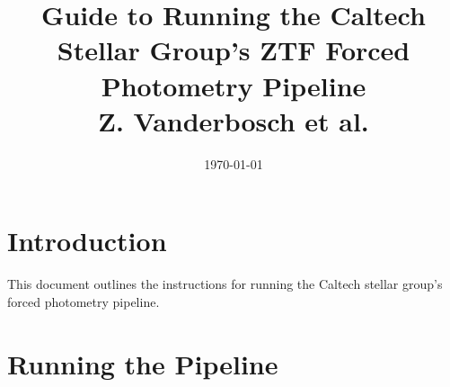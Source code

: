 \documentclass[12pt]{article}
\begin{document}
\vspace{-1cm}
\title{Guide to Running the Caltech Stellar Group's ZTF Forced Photometry Pipeline\\ \vspace{0.5cm}
\normalsize{Z. Vanderbosch et al.}}
\vspace{-5cm}
\date{\today}
\maketitle

\section{Introduction}

This document outlines the instructions for running the Caltech stellar group's forced photometry pipeline.

\section{Running the Pipeline}
\end{document}
